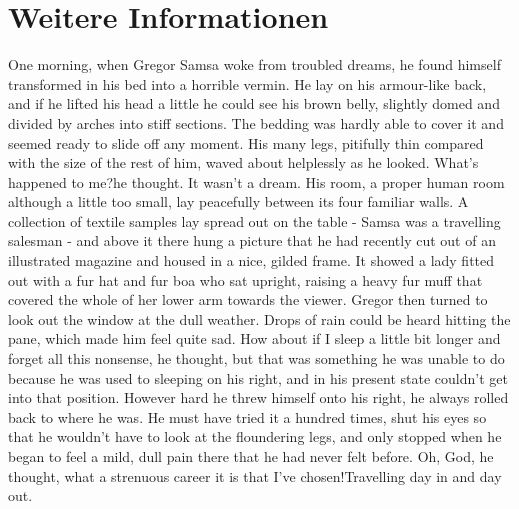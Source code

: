 
\chapter{Weitere Informationen}

One morning, when Gregor Samsa woke from troubled dreams, he found
himself transformed in his bed into a horrible vermin. He lay on
his armour-like back, and if he lifted his head a little he could
see his brown belly, slightly domed and divided by arches into
stiff sections. The bedding was hardly able to cover it and seemed
ready to slide off any moment. His many legs, pitifully thin
compared with the size of the rest of him, waved about helplessly
as he looked. \glqq What's happened to me?\grqq he thought. It
wasn't a dream. His room, a proper human room although a little
too small, lay peacefully between its four familiar walls. A
collection of textile samples lay spread out on the table - Samsa
was a travelling salesman - and above it there hung a picture that
he had recently cut out of an illustrated magazine and housed in a
nice, gilded frame. It showed a lady fitted out with a fur hat and
fur boa who sat upright, raising a heavy fur muff that covered the
whole of her lower arm towards the viewer. Gregor then turned to
look out the window at the dull weather. Drops of rain could be
heard hitting the pane, which made him feel quite sad.  \glqq How
about if I sleep a little bit longer and forget all this
nonsense\grqq, he thought, but that was something he was unable to
do because he was used to sleeping on his right, and in his
present state couldn't get into that position. However hard he
threw himself onto his right, he always rolled back to where he
was. He must have tried it a hundred times, shut his eyes so that
he wouldn't have to look at the floundering legs, and only stopped
when he began to feel a mild, dull pain there that he had never
felt before. \glqq Oh, God, he thought, what a strenuous career it
is that I've chosen!\grqq Travelling day in and day out. 
